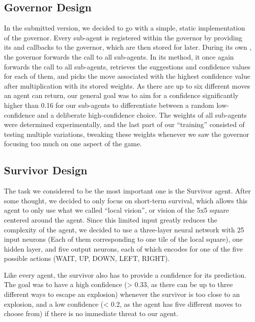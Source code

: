 \subsection{Governor Design}
\label{subsec:design-governor}
In the submitted version, we decided to go with a simple, static implementation of the governor.
Every sub-agent is registered within the governor by providing its  and 
callbacks to the governor, which are then stored for later.
During its own , the governor forwards the call to all sub-agents.
In its  method, it once again forwards the call to all sub-agents, retrieves the suggestions and
confidence values for each of them, and picks the move associated with the highest confidence value after multiplication
with its stored weights.
As there are up to six different moves an agent can return, our general goal was to aim for a confidence significantly
higher than 0.16 for our sub-agents to differentiate between a random low-confidence and a deliberate high-confidence
choice.
The weights of all sub-agents were determined experimentally, and the last part of our \enquote{training} consisted of
testing multiple variations, tweaking these weights whenever we saw the governor focusing too much on one aspect of the
game.

\subsection{Survivor Design}
\label{subsec:survivor-design}
The task we considered to be the most important one is the Survivor agent.
After some thought, we decided to only focus on short-term survival, which allows this agent to only use what we called
\enquote{local vision}, or vision of the 5x5 square centered around the agent.
Since this limited input greatly reduces the complexity of the agent, we decided to use a three-layer neural network
with 25 input neurons (Each of them corresponding to one tile of the local square), one hidden layer, and five output
neurons, each of which encodes for one of the five possible actions (WAIT, UP, DOWN, LEFT, RIGHT).

Like every agent, the survivor also has to provide a confidence for its prediction.
The goal was to have a high confidence (> 0.33, as there can be up to three different ways to escape an explosion)
whenever the survivor is too close to an explosion, and a low confidence (< 0.2, as the agent has five different moves
to choose from) if there is no immediate threat to our agent.

